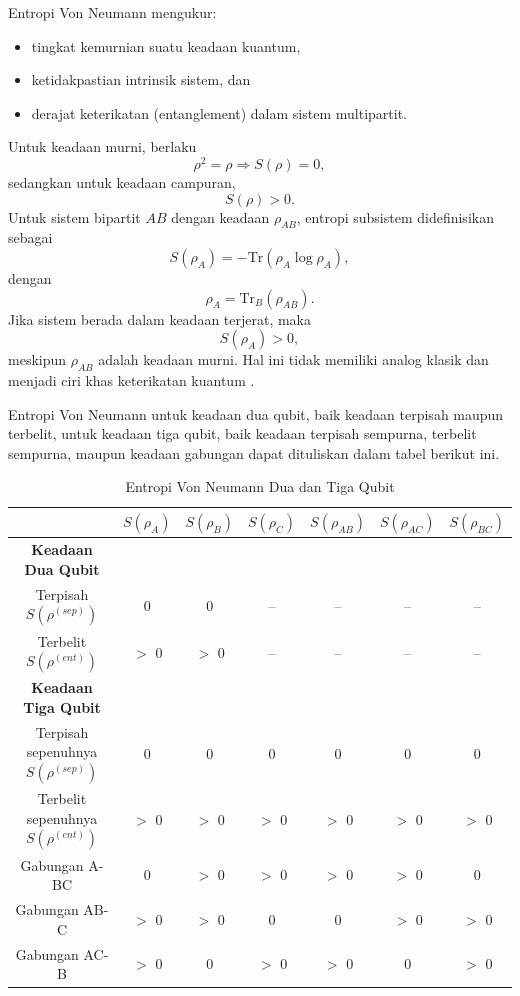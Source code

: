 \par
Entropi Von Neumann mengukur:
\begin{itemize}
    \item tingkat kemurnian suatu keadaan kuantum,
    \item ketidakpastian intrinsik sistem, dan
    \item derajat keterikatan (entanglement) dalam sistem multipartit.
\end{itemize}
Untuk keadaan murni, berlaku
\begin{equation}
\rho^2 = \rho \Rightarrow S(\rho)=0,
\end{equation}
sedangkan untuk keadaan campuran,
\begin{equation}
S(\rho) > 0.
\end{equation}
Untuk sistem bipartit $AB$ dengan keadaan $\rho_{AB}$, entropi subsistem didefinisikan sebagai
\begin{equation}
S(\rho_A) = -\mathrm{Tr}(\rho_A \log \rho_A),
\end{equation}
dengan
\begin{equation}
\rho_A = \mathrm{Tr}_B(\rho_{AB}).
\end{equation}
Jika sistem berada dalam keadaan terjerat, maka
\begin{equation}
S(\rho_A) > 0,
\end{equation}
meskipun $\rho_{AB}$ adalah keadaan murni. Hal ini tidak memiliki analog klasik dan menjadi ciri khas keterikatan kuantum \cite{horodecki2009quantum}.
\par
Entropi Von Neumann untuk keadaan dua qubit, baik keadaan terpisah maupun terbelit, untuk keadaan tiga qubit, baik keadaan terpisah sempurna, terbelit sempurna, maupun keadaan gabungan dapat dituliskan dalam tabel berikut ini.
\newpage
\begin{table}[h]
\centering
\caption{Entropi Von Neumann Dua dan Tiga Qubit}
\begin{tabular}{|c|c|c|c|c|c|c|}
\hline
 & $S(\rho_A)$ & $S(\rho_B)$ & $S(\rho_C)$ & $S(\rho_{AB})$ & $S(\rho_{AC})$ & $S(\rho_{BC})$ \\
\hline
\textbf{Keadaan Dua Qubit} & & & & & & \\
\hline
Terpisah $S(\rho^{(sep)})$ & 0 & 0 & -- & -- & -- & -- \\
\hline
Terbelit $S(\rho^{(ent)})$ & $>$ 0 & $>$ 0 & -- & -- & -- & -- \\
\hline
\textbf{Keadaan Tiga Qubit} & & & & & & \\
\hline
Terpisah sepenuhnya $S(\rho^{(sep)})$ & 0 & 0 & 0 & 0 & 0 & 0 \\
\hline
Terbelit sepenuhnya $S(\rho^{(ent)})$ & $>$ 0 & $>$ 0 & $>$ 0 & $>$ 0 & $>$ 0 & $>$ 0 \\
\hline
Gabungan A-BC & 0 & $>$ 0 & $>$ 0 & $>$ 0 & $>$ 0 & 0 \\
\hline
Gabungan AB-C & $>$ 0 & $>$ 0 & 0 & 0 & $>$ 0 & $>$ 0 \\
\hline
Gabungan AC-B & $>$ 0 & 0 & $>$ 0 & $>$ 0 & 0 & $>$ 0 \\
\hline
\end{tabular}
\end{table}

